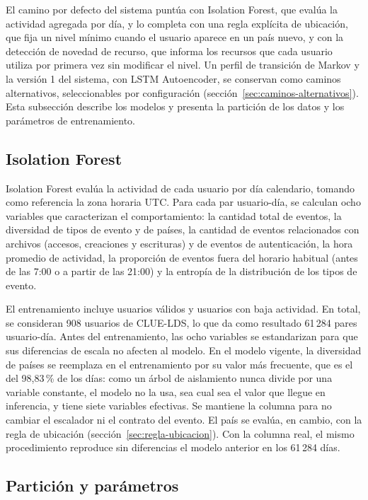 El camino por defecto del sistema puntúa con Isolation Forest, que evalúa la actividad agregada por día, y lo completa con una regla explícita de ubicación, que fija un nivel mínimo cuando el usuario aparece en un país nuevo, y con la detección de novedad de recurso, que informa los recursos que cada usuario utiliza por primera vez sin modificar el nivel. Un perfil de transición de Markov y la versión 1 del sistema, con LSTM Autoencoder, se conservan como caminos alternativos, seleccionables por configuración (sección~\ref{sec:caminos-alternativos}). Esta subsección describe los modelos y presenta la partición de los datos y los parámetros de entrenamiento.
\subsection{Isolation Forest}\label{sec:if-variables}
Isolation Forest evalúa la actividad de cada usuario por día calendario, tomando como referencia la zona horaria UTC. Para cada par usuario-día, se calculan ocho variables que caracterizan el comportamiento: la cantidad total de eventos, la diversidad de tipos de evento y de países, la cantidad de eventos relacionados con archivos (accesos, creaciones y escrituras) y de eventos de autenticación, la hora promedio de actividad, la proporción de eventos fuera del horario habitual (antes de las 7:00 o a partir de las 21:00) y la entropía de la distribución de los tipos de evento.

El entrenamiento incluye usuarios válidos y usuarios con baja actividad. En total, se consideran 908 usuarios de CLUE-LDS, lo que da como resultado 61\,284 pares usuario-día. Antes del entrenamiento, las ocho variables se estandarizan para que sus diferencias de escala no afecten al modelo. En el modelo vigente, la diversidad de países se reemplaza en el entrenamiento por su valor más frecuente, que es el del 98,83\,\% de los días: como un árbol de aislamiento nunca divide por una variable constante, el modelo no la usa, sea cual sea el valor que llegue en inferencia, y tiene siete variables efectivas. Se mantiene la columna para no cambiar el escalador ni el contrato del evento. El país se evalúa, en cambio, con la regla de ubicación (sección~\ref{sec:regla-ubicacion}). Con la columna real, el mismo procedimiento reproduce sin diferencias el modelo anterior en los 61\,284 días.

\subsection{Partición y parámetros}
\label{sub:particion-parametros}

